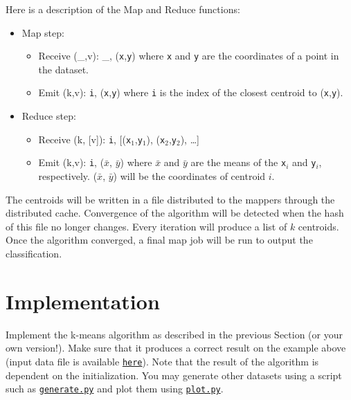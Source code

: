 \documentclass[11pt]{article}
\begin{document}
Here is a description of the Map and Reduce functions:
\begin{itemize}
\item Map step:
  \begin{itemize}
  \item Receive (\_,v): \_, (\texttt{x},\texttt{y}) \newline
    where \texttt{x} and \texttt{y} are the coordinates of a point in the dataset.
  \item Emit (k,v): \texttt{i}, (\texttt{x},\texttt{y}) \newline
    where \texttt{i} is the index of the closest centroid to (\texttt{x},\texttt{y}).
  \end{itemize}
\item Reduce step:
  \begin{itemize}
  \item Receive (k, [v]): \texttt{i}, [(\texttt{x$_1$},\texttt{y$_1$}), (\texttt{x$_2$},\texttt{y$_2$}), \ldots]
  \item Emit (k,v): \texttt{i}, (\texttt{$\bar x$}, \texttt{$\bar
    y$}) \newline where \texttt{$\bar x$} and \texttt{$\bar y$} are
    the means of the \texttt{x$_i$} and \texttt{y$_i$},
    respectively. (\texttt{$\bar x$}, \texttt{$\bar y$}) will be the
    coordinates of centroid $i$.
  \end{itemize}
\end{itemize}
The centroids will be written in a file distributed to the mappers
through the distributed cache. Convergence of the algorithm will be
detected when the hash of this file no longer changes. Every iteration
will produce a list of $k$ centroids. Once the algorithm converged, a
final map job will be run to output the classification.


\section{Implementation}

Implement the k-means algorithm as described in the previous Section
(or your own version!). Make sure that it produces a correct result on
the example above (input data file is available
\href{https://github.com/glatard/big-data-analytics-course/raw/master/labs/kmeans/data-4-1000-points-3.txt}{\texttt{here}}). Note
that the result of the algorithm is dependent on the
initialization. You may generate other datasets using a script such as
\href{https://github.com/glatard/big-data-analytics-course/raw/master/labs/kmeans/generate.py}{\texttt{generate.py}}
and plot them using
\href{https://github.com/glatard/big-data-analytics-course/raw/master/labs/kmeans/plot.py}{\texttt{plot.py}}.
\end{document}
